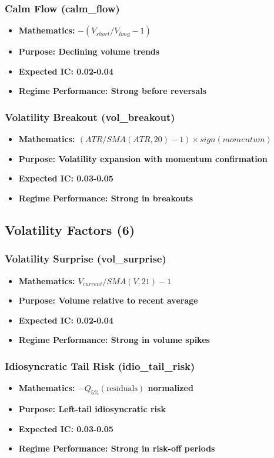 \documentclass[11pt,letterpaper,openany]{book}
\begin{document}
\subsubsection{Calm Flow (calm\_flow)}
\begin{itemize}
    \item \textbf{Mathematics:} $-(V_{short} / V_{long} - 1)$
    \item \textbf{Purpose: Declining volume trends}
    \item \textbf{Expected IC: 0.02-0.04}
    \item \textbf{Regime Performance: Strong before reversals}
\end{itemize}

\subsubsection{Volatility Breakout (vol\_breakout)}
\begin{itemize}
    \item \textbf{Mathematics: $(ATR / SMA(ATR, 20) - 1) \times sign(momentum)$}
    \item \textbf{Purpose: Volatility expansion with momentum confirmation}
    \item \textbf{Expected IC: 0.03-0.05}
    \item \textbf{Regime Performance: Strong in breakouts}
\end{itemize}

\subsection{Volatility Factors (6)}

\subsubsection{Volatility Surprise (vol\_surprise)}
\begin{itemize}
    \item \textbf{Mathematics: $V_{current} / SMA(V, 21) - 1$}
    \item \textbf{Purpose: Volume relative to recent average}
    \item \textbf{Expected IC: 0.02-0.04}
    \item \textbf{Regime Performance: Strong in volume spikes}
\end{itemize}

\subsubsection{Idiosyncratic Tail Risk (idio\_tail\_risk)}
\begin{itemize}
    \item \textbf{Mathematics: $-Q_{5\%}(\text{residuals})$ normalized}
    \item \textbf{Purpose: Left-tail idiosyncratic risk}
    \item \textbf{Expected IC: 0.03-0.05}
    \item \textbf{Regime Performance: Strong in risk-off periods}
\end{itemize}
\end{document}
